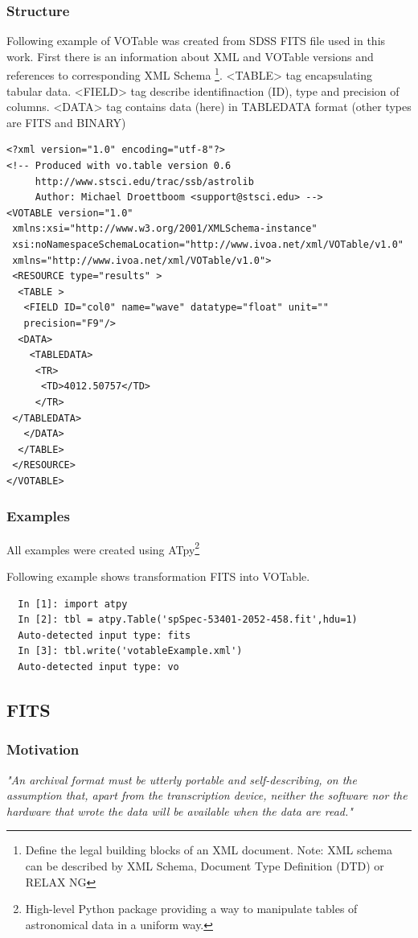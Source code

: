 \subsubsection*{Structure}
Following example of VOTable was created from SDSS FITS file used in
this work. First there is an information about XML and VOTable
versions and references to corresponding XML Schema \footnote{Define
  the legal building blocks of an XML document. Note: XML schema can
  be described by XML Schema, Document Type Definition (DTD) or RELAX
  NG }. <TABLE> tag encapsulating tabular data. <FIELD>
tag describe identifinaction (ID), type and precision of
columns. <DATA> tag contains data (here) in TABLEDATA format (other
types are FITS and BINARY)
 
\begin{lstlisting}
<?xml version="1.0" encoding="utf-8"?>
<!-- Produced with vo.table version 0.6
     http://www.stsci.edu/trac/ssb/astrolib
     Author: Michael Droettboom <support@stsci.edu> -->
<VOTABLE version="1.0"
 xmlns:xsi="http://www.w3.org/2001/XMLSchema-instance"
 xsi:noNamespaceSchemaLocation="http://www.ivoa.net/xml/VOTable/v1.0"
 xmlns="http://www.ivoa.net/xml/VOTable/v1.0">
 <RESOURCE type="results" >
  <TABLE >
   <FIELD ID="col0" name="wave" datatype="float" unit=""
   precision="F9"/>
  <DATA>
    <TABLEDATA>
     <TR>
      <TD>4012.50757</TD>
     </TR>
 </TABLEDATA>
   </DATA>
  </TABLE>
 </RESOURCE>
</VOTABLE>
\end{lstlisting}


\subsubsection*{Examples}
All examples were created using ATpy\footnote{High-level Python package
providing a way to manipulate tables of astronomical data in a uniform
way.}

Following example shows transformation FITS into VOTable. 
\begin{lstlisting}
  In [1]: import atpy
  In [2]: tbl = atpy.Table('spSpec-53401-2052-458.fit',hdu=1)
  Auto-detected input type: fits
  In [3]: tbl.write('votableExample.xml')
  Auto-detected input type: vo
\end{lstlisting}

\subsection{FITS}
\subsubsection*{Motivation}
\emph{
"An archival format must be utterly portable and self-describing, on
the assumption that, apart from the transcription device, neither the
software nor the hardware that wrote the data will be available when
the data are read." \cite{nrc1995}}


